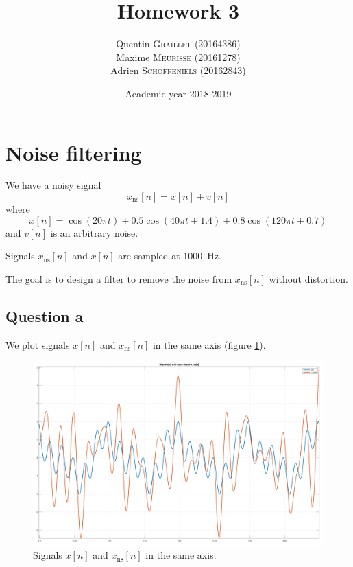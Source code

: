 \documentclass[a4paper, 12pt]{article}
\title{Homework 3}
\author{
    Quentin \textsc{Graillet} (20164386)\\
    Maxime \textsc{Meurisse} (20161278)\\
    Adrien \textsc{Schoffeniels} (20162843)\\
}
\date{Academic year 2018-2019}
\begin{document}
	
	\section*{Noise filtering}
	We have a noisy signal
	\begin{equation*}
	    x_{\text{ns}}[n] = x[n] + v[n]
	\end{equation*}
	where
	\begin{equation*}
	    x[n] = \cos(20\pi t) + \num{0.5}\cos(40\pi t + \num{1.4}) + \num{0.8}\cos(120\pi t + \num{0.7})
	\end{equation*}
	and $v[n]$ is an arbitrary noise.\par
	Signals $x_{\text{ns}}[n]$ and $x[n]$ are sampled at \SI{1000}{\hertz}.\par
	The goal is to design a filter to remove the noise from $x_{\text{ns}}[n]$ without distortion.
	\subsection*{Question a}
	We plot signals $x[n]$ and $x_{\text{ns}}[n]$ in the same axis (figure \ref{fig:question_a}).
	\begin{figure}[H]
	    \centering
	    \includegraphics[width=\textwidth]{resources/pdf/question_a.pdf}
	    \caption{Signals $x[n]$ and $x_{\text{ns}}[n]$ in the same axis.}
	    \label{fig:question_a}
	\end{figure}
\end{document}
